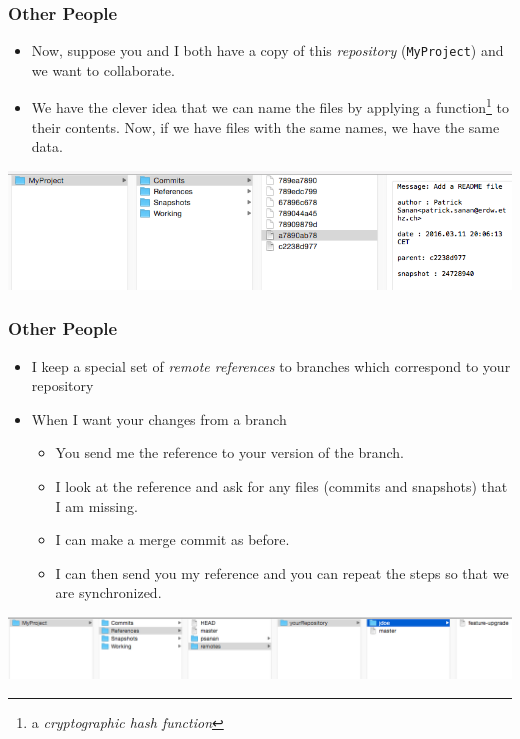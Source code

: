 \documentclass{beamer}
\begin{document}
\begin{frame}[fragile]
\frametitle{Other People}
\begin{itemize}
\item Now, suppose you and I both have a copy of this \emph{repository} (\texttt{MyProject}) and we want to collaborate.
\item We have the clever idea that we can name the files by applying a function\footnote{a \emph{cryptographic hash function}} to their contents. Now, if we have files with the same names, we have the same data.
\end{itemize}
\includegraphics[scale=0.4]{remote1.png}\\
\vspace{10px}
\end{frame}

\begin{frame}[fragile]
\frametitle{Other People}
\begin{itemize}
\item I keep a special set of \emph{remote references} to branches which correspond to your repository
\item When I want your changes from a branch
\begin{itemize}
\item You send me the reference to your version of the branch.
\item I look at the reference and ask for any files (commits and snapshots) that I am missing.
\item I can make a merge commit as before. 
\item I can then send you my reference and you can repeat the steps so that we are synchronized.
\end{itemize}
\end{itemize}
\includegraphics[scale=0.3]{remote2.png}
\vspace{10px}
\end{frame}
\end{document}
